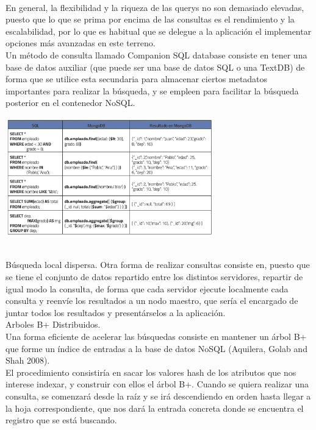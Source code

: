 \documentclass[twoside,onecolumn]{article}
\begin{document}
\begin{flushright}
\begin{itemize}
\begin{center}
		\end{center}	
\textbf{}\\
En general, la flexibilidad y la riqueza de las querys no son demasiado elevadas, puesto que lo que se prima por encima de las consultas es el rendimiento y la escalabilidad, por lo que es habitual que se delegue a la aplicación el implementar opciones más avanzadas en este terreno.
\textbf{}\\
Un método de consulta llamado Companion SQL database consiste en tener una base de datos auxiliar (que puede ser una base de datos SQL o una TextDB) de forma que se utilice esta secundaria para almacenar ciertos metadatos importantes para realizar la búsqueda, y se empleen para facilitar la búsqueda posterior en el contenedor NoSQL.
\begin{center}
		\includegraphics[width=9cm]{./Imagenes/2}
		\end{center}	
\textbf{}\\
Búsqueda local dispersa. Otra forma de realizar consultas consiste en, puesto que se tiene el conjunto de datos repartido entre los distintos servidores, repartir de igual modo la consulta, de forma que cada servidor ejecute localmente cada consulta y reenvíe los
resultados a un nodo maestro, que sería el encargado de juntar todos los resultados y presentárselos a la aplicación.
\textbf{}\\
Arboles B+ Distribuidos.
\textbf{}\\
Una forma eficiente de acelerar las búsquedas consiste en mantener un árbol B+ que forme un índice de entradas a la base de datos NoSQL (Aquilera, Golab and Shah 2008).
\textbf{}\\
El procedimiento consistiría en sacar los valores hash de los atributos que nos interese indexar, y construir con ellos el árbol B+. Cuando se quiera realizar una consulta, se comenzará desde la raíz y se irá descendiendo en orden hasta llegar a la hoja correspondiente, que nos dará la entrada concreta donde se encuentra el registro que se está buscando.
\begin{center}

\end{center}
\end{itemize}
\end{flushright}
\end{document}
